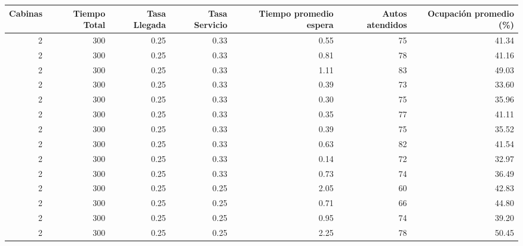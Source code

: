 \documentclass[12pt]{article}
\begin{document}
\begin{tabular}{rrrrrrr}
    \toprule
     Cabinas &  Tiempo Total &  Tasa Llegada &  Tasa Servicio &  Tiempo promedio espera &  Autos atendidos &  Ocupación promedio (\%) \\
    \midrule
           2 &           300 &          0.25 &           0.33 &                    0.55 &               75 &                   41.34 \\
           2 &           300 &          0.25 &           0.33 &                    0.81 &               78 &                   41.16 \\
           2 &           300 &          0.25 &           0.33 &                    1.11 &               83 &                   49.03 \\
           2 &           300 &          0.25 &           0.33 &                    0.39 &               73 &                   33.60 \\
           2 &           300 &          0.25 &           0.33 &                    0.30 &               75 &                   35.96 \\
           2 &           300 &          0.25 &           0.33 &                    0.35 &               77 &                   41.11 \\
           2 &           300 &          0.25 &           0.33 &                    0.39 &               75 &                   35.52 \\
           2 &           300 &          0.25 &           0.33 &                    0.63 &               82 &                   41.54 \\
           2 &           300 &          0.25 &           0.33 &                    0.14 &               72 &                   32.97 \\
           2 &           300 &          0.25 &           0.33 &                    0.73 &               74 &                   36.49 \\
           2 &           300 &          0.25 &           0.25 &                    2.05 &               60 &                   42.83 \\
           2 &           300 &          0.25 &           0.25 &                    0.71 &               66 &                   44.80 \\
           2 &           300 &          0.25 &           0.25 &                    0.95 &               74 &                   39.20 \\
           2 &           300 &          0.25 &           0.25 &                    2.25 &               78 &                   50.45 \\

\end{tabular}
\end{document}
